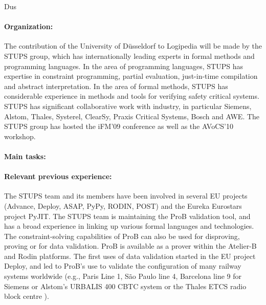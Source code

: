 \begin{sitedescription}{Dus}

\paragraph{Organization:}


The contribution of the University of D\"usseldorf to Logipedia will be made by the STUPS group, 
which has internationally leading experts in formal methods and programming languages.
In the area of programming languages, STUPS has expertise in constraint programming,
 partial evaluation, just-in-time compilation and abstract interpretation.
In the area of formal methods, STUPS has considerable experience in methods and
 tools for verifying safety critical systems.
STUPS has significant collaborative work with industry,
in particular Siemens, Alstom, Thales, Systerel, ClearSy, Praxis Critical Systems, Bosch  and AWE.
The STUPS group has hosted the iFM'09 conference as well as the AVoCS'10 workshop.



\paragraph{Main tasks:}

\begin{compactitem}
\item{} 
\end{compactitem}


\paragraph{Relevant previous experience:}



The STUPS team and its members have been involved in several EU projects
 (Advance, Deploy, ASAP, PyPy, RODIN, POST) and the Eureka Eurostars project PyJIT.
The STUPS team is maintaining the ProB validation tool, and has a broad experience
 in linking up various formal languages and technologies.
The constraint-solving capabilities of ProB can also be used for 
  disproving, proving or for data validation.
ProB is available as a prover within the Atelier-B and Rodin platforms.
The first uses of data validation started in the EU project Deploy, and led to
 ProB's use to validate the configuration of many railway systems worldwide
 (e.g.,
 Paris Line 1,  S\~{a}o Paulo line 4, Barcelona line 9 for Siemens
 or Alstom's URBALIS 400 CBTC system %
 or the Thales ETCS radio block centre
 ).


\end{sitedescription}
